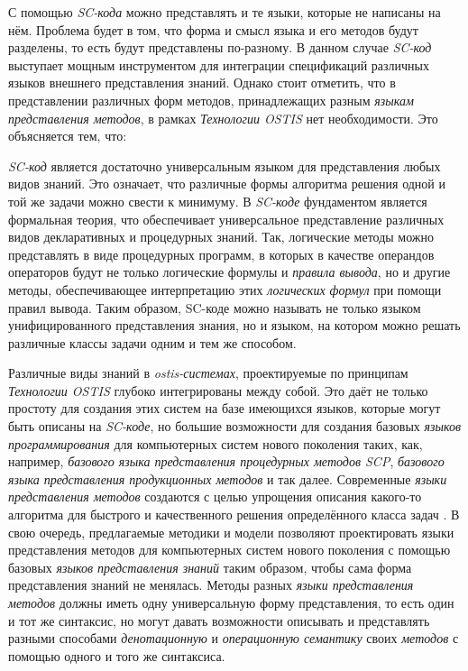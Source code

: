С помощью \textit{SC-кода} можно представлять и те языки, которые не написаны на нём. Проблема будет в том, что форма и смысл языка и его методов будут разделены, то есть будут представлены по-разному. В данном случае \textit{SC-код} выступает мощным инструментом для интеграции спецификаций различных языков внешнего представления знаний. Однако стоит отметить, что в представлении различных форм методов, принадлежащих разным \textit{языкам представления методов}, в рамках \textit{Технологии OSTIS} нет необходимости. Это объясняется тем, что:
\begin{textitemize}
    \item \textit{SC-код} является достаточно универсальным языком для представления любых видов знаний. Это означает, что различные формы алгоритма решения одной и той же задачи можно свести к минимуму. В \textit{SC-коде} фундаментом является формальная теория, что обеспечивает универсальное представление различных видов декларативных и процедурных знаний. Так, логические методы можно представлять в виде процедурных программ, в которых в качестве операндов операторов будут не только логические формулы и \textit{правила вывода}, но и другие методы, обеспечивающее интерпретацию этих \textit{логических формул} при помощи правил вывода. Таким образом, SC-коде можно называть не только языком унифицированного представления знания, но и языком, на котором можно решать различные классы задачи одним и тем же способом.
    \item Различные виды знаний в \textit{ostis-системах}, проектируемые по принципам \textit{Технологии OSTIS} глубоко интегрированы между собой. Это даёт не только простоту для создания этих систем на базе имеющихся языков, которые могут быть описаны на \textit{SC-коде}, но большие возможности для создания базовых \textit{языков программирования} для компьютерных систем нового поколения таких, как, например, \textit{базового языка представления процедурных методов SCP}, \textit{базового языка представления продукционных методов} и так далее. Современные \textit{языки представления методов} создаются с целью упрощения описания какого-то алгоритма для быстрого и качественного решения определённого класса задач \cite{Benri2000}. В свою очередь, предлагаемые методики и модели позволяют проектировать языки представления методов для компьютерных систем нового поколения с помощью базовых \textit{языков представления знаний} таким образом, чтобы сама форма представления знаний не менялась. Методы разных \textit{языки представления методов} должны иметь одну универсальную форму представления, то есть один и тот же синтаксис, но могут давать возможности описывать и представлять разными способами \textit{денотационную} и \textit{операционную семантику} своих \textit{методов} с помощью одного и того же синтаксиса.

\end{textitemize}
